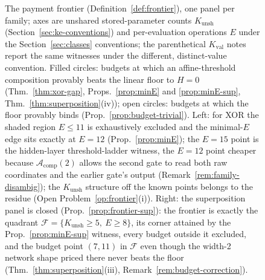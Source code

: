 \documentclass[twocolumn,10pt]{article}
\theoremstyle{definition}
\theoremstyle{remark}
\newcommand{\cA}{\mathcal{A}}
\newcommand{\cF}{\mathcal{F}}
\newcommand{\Kunsh}{K_{\mathrm{unsh}}}
\newcommand{\Kval}{K_{\mathrm{val}}}
\begin{document}
\begin{figure}[t]
\caption{The payment frontier (Definition~\ref{def:frontier}), one
panel per family; axes are unshared stored-parameter counts $\Kunsh$
(Section~\ref{sec:ke-conventions}) and per-evaluation operations $E$
under the
Section~\ref{sec:classes} conventions; the parenthetical $\Kval$ notes
report the same witnesses under the different, distinct-value
convention. Filled circles: budgets at which
an affine-threshold composition provably beats the linear floor to
$H = 0$ (Thm.~\ref{thm:xor-gap}, Props.~\ref{prop:minE}
and \ref{prop:minE-sup}, Thm.~\ref{thm:superposition}(iv)); open
circles: budgets at which the
floor provably binds (Prop.~\ref{prop:budget-trivial}). Left: for XOR
the shaded region $E \le 11$ is exhaustively
excluded and the minimal-$E$ edge sits exactly at $E = 12$
(Prop.~\ref{prop:minE}); the $E = 15$ point is the hidden-layer
threshold-ladder witness, the $E = 12$ point cheaper because
$\cA_{\mathrm{comp}}(2)$ allows the second gate to read both raw
coordinates and the earlier gate's output
(Remark~\ref{rem:family-disambig}); the $\Kunsh$ structure off the
known points belongs to the residue (Open
Problem~\ref{op:frontier}(i)). Right: the superposition panel is
closed (Prop.~\ref{prop:frontier-sup}): the frontier is exactly the
quadrant $\cF = \{\Kunsh \ge 5,\ E \ge 8\}$, its corner attained by the
Prop.~\ref{prop:minE-sup} witness, every budget outside it excluded,
and the budget point $(7,11)$ in $\cF$ even though the width-2 network
shape priced there never beats the floor
(Thm.~\ref{thm:superposition}(iii), Remark~\ref{rem:budget-correction}).}
\label{fig:frontier}
\end{figure}
\end{document}
